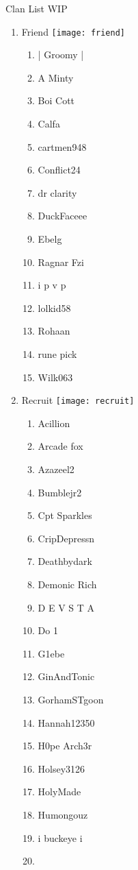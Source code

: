 \documentclass{article}
\begin{document}
Clan List WIP
\begin{enumerate}[I]
  \item 
    Friend \texttt{[image: friend]}
    \begin{enumerate}[I]
      \item
	| Groomy |
      \item
	A Minty
      \item
	Boi Cott
      \item
	Calfa
      \item
	cartmen948
      \item
	Conflict24
      \item
	dr clarity
      \item
	DuckFaceee
      \item
	Ebelg
      \item
	Ragnar Fzi
      \item
	i p v p
      \item
	lolkid58
      \item
	Rohaan
      \item
	rune pick
      \item
	Wilk063
    \end{enumerate}
  \item
    Recruit \texttt{[image: recruit]}
    \begin{enumerate}[I]
      \item 
	Acillion
      \item
	Arcade fox
      \item
	Azazeel2
      \item
	Bumblejr2
      \item
	Cpt Sparkles
      \item
	CripDepressn
      \item
	Deathbydark
      \item
	Demonic Rich
      \item
	D E V S T A
      \item
	Do 1
      \item
	G1ebe
      \item
	GinAndTonic
      \item
	GorhamSTgoon
      \item
	Hannah12350
      \item
	H0pe Arch3r
      \item
	Holsey3126
      \item
	HolyMade
      \item
	Humongouz
      \item
	i buckeye i
      \item

\end{enumerate}
\end{enumerate}
\end{document}
